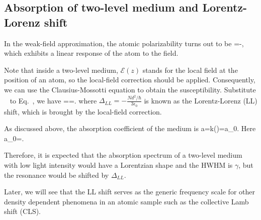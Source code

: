 \subsection{Absorption of two-level medium and Lorentz-Lorenz shift}
In the weak-field approximation, the atomic polarizability turns out to be
\bea
\alpha=-,
\label{POLARIZABILITY}
\eea
which exhibits a linear response of the atom to the field.

Note that inside a two-level medium, $\mathcal E(z)$ stands for the local field at the position of an atom, so the local-field correction should be applied. Consequently, we can use the Clausius-Mossotti equation to obtain the susceptibility. Substitute ~ to Eq.~, we have
\bea
\chi==.
\eea
where $\Delta_{LL}=-\frac{Nd^2/\hbar}{3\epsilon_0}$ is known as the Lorentz-Lorenz (LL) shift, which is brought by the local-field correction.

As discussed above, the absorption coefficient of the medium is
\bea 
a=k\Im(\chi)=a_0.
\eea
Here
\bea
a_0=.
\eea

Therefore, it is expected that the absorption spectrum of a two-level medium with low light intensity would have a Lorentzian shape and the HWHM is $\gamma$, but the resonance would be shifted by $\Delta_{LL}$.

Later, we will see that the LL shift serves as the generic frequency scale for other density dependent phenomena in an atomic sample such as the collective Lamb shift (CLS). 




